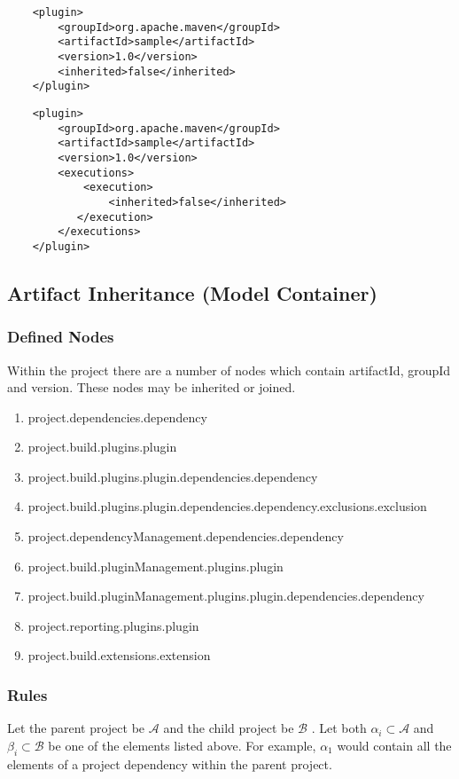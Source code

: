 \documentclass[12pt]{amsart}
\begin{document}
\begin{verbatim}
    <plugin>
        <groupId>org.apache.maven</groupId>
        <artifactId>sample</artifactId>
        <version>1.0</version>
        <inherited>false</inherited>
    </plugin>
\end{verbatim}

\begin{verbatim}
    <plugin>
        <groupId>org.apache.maven</groupId>
        <artifactId>sample</artifactId>
        <version>1.0</version>
        <executions>
            <execution>
                <inherited>false</inherited>
           </execution>
        </executions>
    </plugin>
\end{verbatim}

\subsection{Artifact Inheritance (Model Container)}
\subsubsection{Defined Nodes}
Within the project there are a number of nodes which contain artifactId, groupId and version. These nodes may be inherited or joined.
\begin{enumerate}
\item project.dependencies.dependency
\item project.build.plugins.plugin
\item project.build.plugins.plugin.dependencies.dependency
\item project.build.plugins.plugin.dependencies.dependency.exclusions.exclusion
\item project.dependencyManagement.dependencies.dependency
\item project.build.pluginManagement.plugins.plugin
\item project.build.pluginManagement.plugins.plugin.dependencies.dependency
\item project.reporting.plugins.plugin
\item project.build.extensions.extension
\end{enumerate}

\subsubsection{Rules}
Let the parent project be \begin{math}\mathcal{A}\end{math} and the child project be  \begin{math}\mathcal{B}\end{math} . Let both \begin{math}\alpha_i \subset \mathcal{A}\end{math} and \begin{math}\beta_i \subset \mathcal{B}\end{math} be one of the elements listed above. For example,  \begin{math}\alpha_1\end{math} would contain all the elements of a project dependency within the parent project.
\end{document}
